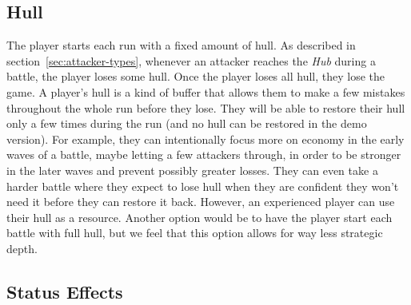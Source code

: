 \subsection{Hull}\label{sec:design-hull}

The player starts each run with a fixed amount of hull.
As described in section~\ref{sec:attacker-types}, whenever an attacker reaches the \emph{Hub} during a battle, the player loses some hull.
Once the player loses all hull, they lose the game.
A player's hull is a kind of buffer that allows them to make a few mistakes throughout the whole run before they lose.
They will be able to restore their hull only a few times during the run (and no hull can be restored in the demo version).
For example, they can intentionally focus more on economy in the early waves of a battle, maybe letting a few attackers through, in order to be stronger in the later waves and prevent possibly greater losses.
They can even take a harder battle where they expect to lose hull when they are confident they won't need it before they can restore it back.
However, an experienced player can use their hull as a resource.
Another option would be to have the player start each battle with full hull, but we feel that this option allows for way less strategic depth.

\subsection{Status Effects}

